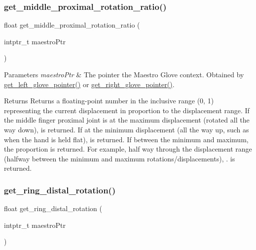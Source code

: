 \subsubsection{\texorpdfstring{get\+\_\+middle\+\_\+proximal\+\_\+rotation\+\_\+ratio()}{get\_middle\_proximal\_rotation\_ratio()}}
{\footnotesize\ttfamily float get\+\_\+middle\+\_\+proximal\+\_\+rotation\+\_\+ratio (\begin{DoxyParamCaption}\item[{intptr\+\_\+t}]{maestro\+Ptr }\end{DoxyParamCaption})}


\begin{DoxyParams}{Parameters}
{\em maestro\+Ptr} & The pointer the Maestro Glove context. Obtained by \hyperlink{group__glove_management_ga63ce3c99d4a8b8db851b22af9185764e}{get\+\_\+left\+\_\+glove\+\_\+pointer()} or \hyperlink{group__glove_management_ga9b8fd9d91aeac3f8da50f7a7eba0c32b}{get\+\_\+right\+\_\+glove\+\_\+pointer()}. \\
\hline
\end{DoxyParams}
\begin{DoxyReturn}{Returns}
Returns a floating-\/point number in the inclusive range {\ttfamily (0, 1)} representing the current displacement in proportion to the displacement range. If the middle finger proximal joint is at the maximum displacement (rotated all the way down), {} is returned. If at the minimum displacement (all the way up, such as when the hand is held flat), {} is returned. If between the minimum and maximum, the proportion is returned. For example, half way through the displacement range (halfway between the minimum and maximum rotations/displacements), {.} is returned. 
\end{DoxyReturn}
\mbox{\label{group__rotation_access_ga684f53b38b169aaab88de85578387a38}} 
\subsubsection{\texorpdfstring{get\+\_\+ring\+\_\+distal\+\_\+rotation()}{get\_ring\_distal\_rotation()}}
{\footnotesize\ttfamily float get\+\_\+ring\+\_\+distal\+\_\+rotation (\begin{DoxyParamCaption}\item[{intptr\+\_\+t}]{maestro\+Ptr }\end{DoxyParamCaption})}


